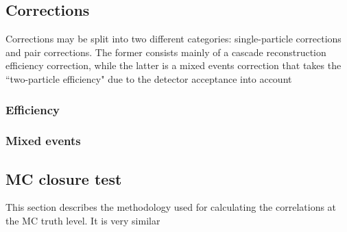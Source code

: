 

\subsection{Corrections}
    Corrections may be split into two different categories: single-particle corrections and pair corrections. The former consists mainly of a cascade reconstruction efficiency correction, while the latter is a mixed events correction that takes the ``two-particle efficiency" due to the detector acceptance into account
\subsubsection{Efficiency}
\subsubsection{Mixed events}

\subsection{MC closure test}
This section describes the methodology used for calculating the correlations at the MC truth level. It is very similar 